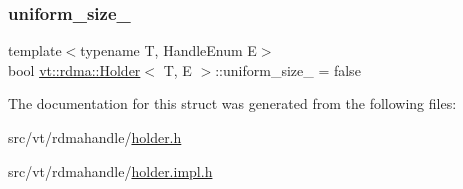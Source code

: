\mbox{\label{structvt_1_1rdma_1_1_holder_a6c137c841a55e053778597860c6761e8}} 
\subsubsection{\texorpdfstring{uniform\+\_\+size\+\_\+}{uniform\_size\_}}
{\footnotesize\ttfamily template$<$typename T, Handle\+Enum E$>$ \\
bool \hyperlink{structvt_1_1rdma_1_1_holder}{vt\+::rdma\+::\+Holder}$<$ T, E $>$\+::uniform\+\_\+size\+\_\+ = false\hspace{0.3cm}{\ttfamily [private]}}



The documentation for this struct was generated from the following files\+:\begin{DoxyCompactItemize}
\item 
src/vt/rdmahandle/\hyperlink{rdmahandle_2holder_8h}{holder.\+h}\item 
src/vt/rdmahandle/\hyperlink{rdmahandle_2holder_8impl_8h}{holder.\+impl.\+h}\end{DoxyCompactItemize}
